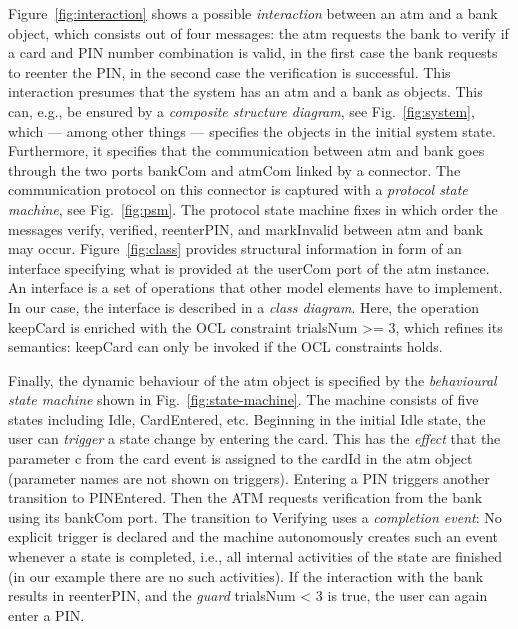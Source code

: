 \documentclass[10pt,fleqn,%
\ifpretendfinal
final%
\else
draft%
\fi,
]{scrreprt}
\newcommand{\uml}[1]{\textsf{#1}}
\begin{document}
Figure~\ref{fig:interaction} shows a possible \emph{interaction}
between an \uml{atm} and a \uml{bank} object, which consists out of
four messages: the \uml{atm} requests the \uml{bank} to \uml{verify}
if a card and PIN number combination is valid, in the first case the
\uml{bank} requests to reenter the PIN, in the second case the
verification is successful.  This interaction presumes that the system
has an \uml{atm} and a \uml{bank} as objects. This can, e.g., be
ensured by a \emph{composite structure diagram}, see
Fig.~\ref{fig:system}, which --- among other things --- specifies the
objects in the initial system state.  Furthermore, it specifies that
the communication between \uml{atm} and \uml{bank} goes through the
two ports \uml{bankCom} and \uml{atmCom} linked by a connector.  The
communication protocol on this connector is captured with a
\emph{protocol state machine}, see Fig.~\ref{fig:psm}.  The protocol
state machine fixes in which order the messages \uml{verify},
\uml{verified}, \uml{reenterPIN}, and \uml{markInvalid} between
\uml{atm} and \uml{bank} may occur.  Figure~\ref{fig:class} provides
structural information in form of an interface specifying what is
provided at the \uml{userCom} port of the \uml{atm} instance. An
interface is a set of operations that other model elements have to
implement. In our case, the interface is described in a \emph{class
  diagram}. Here, the operation \uml{keepCard} is enriched with the
OCL constraint \uml{trialsNum >= 3}, which refines its semantics:
\uml{keepCard} can only be invoked if the OCL constraints holds.

Finally, the dynamic behaviour of the \uml{atm} object is specified by
the \emph{behavioural state machine} shown in
Fig.~\ref{fig:state-machine}. The machine consists of five states
including \uml{Idle}, \uml{CardEntered}, etc.  Beginning in the
initial \uml{Idle} state, the user can \emph{trigger} a state change
by entering the \uml{card}. This has the \emph{effect} that the
parameter \uml{c} from the \uml{card} event is assigned to the
\uml{cardId} in the \uml{atm} object (parameter names are not shown on
triggers). Entering a \uml{PIN} triggers another transition to
\uml{PINEntered}.  Then the ATM requests verification from the bank
using its \uml{bankCom} port.  The transition to \uml{Verifying} uses
a \emph{completion event}: No explicit trigger is declared and the
machine autonomously creates such an event whenever a state is
completed, i.e., all internal activities of the state are finished (in
our example there are no such activities).  If the interaction with
the bank results in \uml{reenterPIN}, and the \emph{guard}
\uml{trialsNum < 3} is true, the user can again enter a \uml{PIN}.
\end{document}
